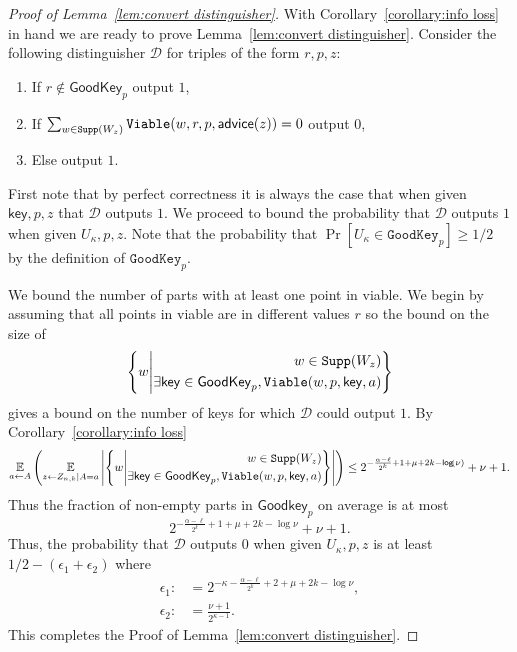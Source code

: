 \begin{proof}[Proof of Lemma~\ref{lem:convert distinguisher}]
\noindent
With Corollary~\ref{corollary:info loss} in hand we are ready to prove Lemma~\ref{lem:convert distinguisher}.
Consider the following distinguisher $\mathcal{D}$ for triples of the form $r, p, z$:
\begin{enumerate}
\item If $r \not\in \mathsf{GoodKey}_p$ output $1$,
\item If $\sum_{w\in\mathtt{Supp}(W_z)} \mathtt{Viable}(w, r, p, {\mathsf{advice}}(z)) =0 $ output $0$,
\item Else output $1$.
\end{enumerate}
First note that by perfect correctness it is always the case that when given $\mathsf{key}, p, z$ that $\mathcal{D}$ outputs $1$.  We proceed to bound the probability that $\mathcal{D}$ outputs $1$ when given $U_\kappa, p, z$.  Note that the probability that $\Pr[U_\kappa \in \mathtt{GoodKey}_p] \ge 1/2$ by the definition of $\mathtt{GoodKey}_p$. 

We bound the number of parts with at least one point in viable.  We begin by assuming that all points in viable are in different  values $r$ so the bound on the size of 
\[
\left\{ 
w\middle| \begin{aligned}w\in \mathtt{Supp}(W_z)\\\exists \mathsf{key}\in\mathsf{GoodKey}_p, \mathtt{Viable}(w,p,\mathsf{key},a)\end{aligned} \right\}\]
gives a bound on the number of keys for which $\mathcal{D}$ could output $1$. By Corollary~\ref{corollary:info loss} 
\[
\operatorname*{\mathbb{E}}_{a\leftarrow A}\left(\operatorname*{\mathbb{E}}_{z\leftarrow Z_{n,k}| A=a} \left|\left\{ 
w\middle| \begin{aligned}w\in \mathtt{Supp}(W_z)\\\exists \mathsf{key}\in\mathsf{GoodKey}_p, \mathtt{Viable}(w,p,\mathsf{key},a)\end{aligned} \right\} \right| \right)\le 2^{-\frac{\alpha-\ell}{2^k}+1+\mu+2k-\mathsf{log}\!\left(\nu\right)}+\nu+1.
\]
Thus the fraction of non-empty parts in $\mathsf{Goodkey}_p$ on average is at most 
\[
2^{-\frac{\alpha-\ell}{2^k}+1+\mu+2k-\log{\nu}}+\nu+1.
\]
Thus, the probability that $\mathcal{D}$ outputs $0$ when given $U_\kappa, p, z$ is at least 
$1/2-(\epsilon_1+\epsilon_2)$
where 
\begin{align*}
\epsilon_1:&=2^{-\kappa-\frac{\alpha-\ell}{2^k}+2+\mu+2k-\log{\nu}},\\
\epsilon_2:&=\frac{\nu+1}{2^{\kappa-1}}.
\end{align*}
\noindent
This completes the Proof of Lemma~\ref{lem:convert distinguisher}.
\end{proof}

